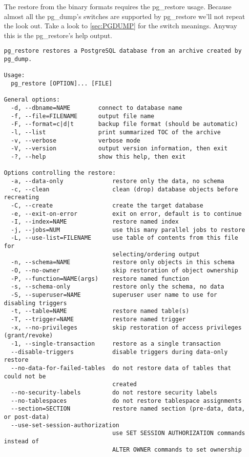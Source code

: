 The restore from the binary formats requires the pg\_restore usage. Because almost 
all the pg\_dump's switches are supported by pg\_restore we'll not repeat the look out. Take a look 
to  \ref{sec:PGDUMP} for the switch meanings. Anyway this is the pg\_restore's help output.
\newline 

\begin{verbatim}
pg_restore restores a PostgreSQL database from an archive created by pg_dump.

Usage:
  pg_restore [OPTION]... [FILE]

General options:
  -d, --dbname=NAME        connect to database name
  -f, --file=FILENAME      output file name
  -F, --format=c|d|t       backup file format (should be automatic)
  -l, --list               print summarized TOC of the archive
  -v, --verbose            verbose mode
  -V, --version            output version information, then exit
  -?, --help               show this help, then exit

Options controlling the restore:
  -a, --data-only              restore only the data, no schema
  -c, --clean                  clean (drop) database objects before recreating
  -C, --create                 create the target database
  -e, --exit-on-error          exit on error, default is to continue
  -I, --index=NAME             restore named index
  -j, --jobs=NUM               use this many parallel jobs to restore
  -L, --use-list=FILENAME      use table of contents from this file for
                               selecting/ordering output
  -n, --schema=NAME            restore only objects in this schema
  -O, --no-owner               skip restoration of object ownership
  -P, --function=NAME(args)    restore named function
  -s, --schema-only            restore only the schema, no data
  -S, --superuser=NAME         superuser user name to use for disabling triggers
  -t, --table=NAME             restore named table(s)
  -T, --trigger=NAME           restore named trigger
  -x, --no-privileges          skip restoration of access privileges (grant/revoke)
  -1, --single-transaction     restore as a single transaction
  --disable-triggers           disable triggers during data-only restore
  --no-data-for-failed-tables  do not restore data of tables that could not be
                               created
  --no-security-labels         do not restore security labels
  --no-tablespaces             do not restore tablespace assignments
  --section=SECTION            restore named section (pre-data, data, or post-data)
  --use-set-session-authorization
                               use SET SESSION AUTHORIZATION commands instead of
                               ALTER OWNER commands to set ownership


\end{verbatim}
